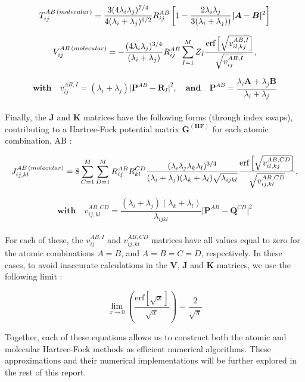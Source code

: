 \begin{equation}\label{eq:MolecularT}
T_{ij}^{AB \thinspace(molecular)}=\frac{3(4\lambda_i\lambda_j)^{7/4}}{4(\lambda_i+\lambda_j)^{5/2}}R_{ij}^{AB}\left[1-\frac{2\lambda_i\lambda_j}{3(\lambda_i+\lambda_j))} \boldsymbol{|} \boldsymbol{A}-\boldsymbol{B} \boldsymbol{|}^2\right]
\end{equation}

\begin{equation}\label{eq:MolecularV}
V_{ij}^{AB \thinspace(molecular)}=-\frac{(4\lambda_i\lambda_j)^{3/4}}{(\lambda_i+\lambda_j)}R_{ij}^{AB}\sum_{I=1}^{M}Z_I\frac{\text{erf}\left[ \sqrt{v_{il,kj}^{AB,I}} \right]}{\sqrt{v_{ij}^{AB,I}}},
\end{equation}

\begin{equation*}
\textbf{with}\quad v_{ij}^{AB,I}=(\lambda_i+\lambda_j)\boldsymbol{|}\boldsymbol{P}^{AB}-\boldsymbol{R}_I\boldsymbol{|}^2, \quad \mathbf{and} \quad \boldsymbol{P}^{AB}=\frac{\lambda_i \boldsymbol{A}+\lambda_j \boldsymbol{B}}{\lambda_i + \lambda_j}
\end{equation*}\\

Finally, the $\boldsymbol{J}$ and $\boldsymbol{K}$ matrices have the following forms (through index swaps), contributing to a Hartree-Fock potential matrix $\boldsymbol{G^{(HF)}}$ for each atomic combination, AB \cite{quiney_art_nodate}:

\begin{equation}\label{eq:MolecularJ}
J_{ij,kl}^{AB\thinspace(molecular)}=8\sum_{C=1}^{M}\sum_{D=1}^{M}R_{ij}^{AB}R_{kl}^{CD}\frac{(\lambda_i\lambda_j\lambda_k\lambda_l)^{3/4}}{(\lambda_i+\lambda_j)(\lambda_k+\lambda_l)\sqrt{\lambda_{ijkl}}}\frac{\text{erf}\left[ \sqrt{v_{il,kj}^{AB,CD}} \right]}{\sqrt{v_{ij,kl}^{AB,CD}}},
\end{equation}

\begin{equation*}
\textbf{with}\quad v_{ij,kl}^{AB,CD}=\frac{(\lambda_i+\lambda_j)(\lambda_k+\lambda_l)}{\lambda_{ijkl}}\boldsymbol{|}\boldsymbol{P}^{AB}-\boldsymbol{Q}^{CD}\boldsymbol{|}^2
\end{equation*}\\

For each of these, the $v_{ij}^{AB,I}$ and $v_{ij,kl}^{AB,CD}$ matrices have all values equal to zero for the atomic combinations $A=B$, and $A=B=C=D$, respectively. In these cases, to avoid inaccurate calculations in the $\boldsymbol{V}$, $\boldsymbol{J}$ and $\boldsymbol{K}$ matrices, we use the following limit \cite{quiney_art_nodate}:

\begin{equation*}
\lim_{x \to 0} \left( \frac{\text{erf}[\sqrt{x}]}{\sqrt{x}} \right)=\frac{2}{\sqrt{\pi}}
\end{equation*}

Together, each of these equations allows us to construct both the atomic and molecular Hartree-Fock methods as efficient numerical algorithms. These approximations and their numerical implementations will be further explored in the rest of this report.